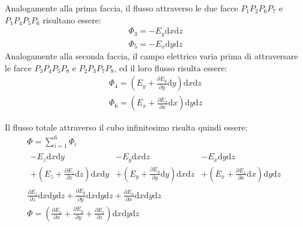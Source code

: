 \documentclass{article}
\newcommand{\df}{\mathrm{d}}
\numberwithin{equation}{subsection}
\begin{document}
Analogamente alla prima faccia, il flusso attraverso le due facce $P_1P_2P_6P_7$ e $P_1P_4P_5P_6$ risultano essere:
\begin{gather*}
    \Phi_3=-E_y\df x\df z\\
    \Phi_5=-E_x\df y\df z
\end{gather*}
Analogamente alla seconda faccia, il campo elettrico varia prima di attraversare le facce $P_3P_4P_5P_8$ e $P_2P_3P_7P_8$, ed il loro flusso risulta essere:
\begin{gather*}
    \Phi_4=\left(E_y+\displaystyle\frac{\partial E_y}{\partial y}\df  y\right)\df x\df z\\
    \Phi_6=\left(E_x+\displaystyle\frac{\partial E_x}{\partial x}\df  x\right)\df y\df z
\end{gather*}

Il flusso totale attraverso il cubo infinitesimo risulta quindi essere:
\begin{gather*}
    \Phi=\displaystyle\sum_{i=1}^6\Phi_i\\
    \begin{matrix}
        -E_z\df x\df y & -E_y\df x\df z & -E_x\df y\df z\\
        +\left(E_z+\displaystyle\frac{\partial E_z}{\partial z}\df z\right)\df x\df y & +\left(E_y+\displaystyle\frac{\partial E_y}{\partial y}\df  y\right)\df x\df z & +\left(E_x+\displaystyle\frac{\partial E_x}{\partial x}\df  x\right)\df y\df z
    \end{matrix}\\
    \displaystyle\frac{\partial E_z}{\partial z}\df x\df y\df z+\frac{\partial E_y}{\partial y}\df x\df y\df z+\frac{\partial E_x}{\partial x}\df x\df y\df z\\
    \Phi=\left(\displaystyle\frac{\partial E_x}{\partial x}+\frac{\partial E_y}{\partial y}+\frac{\partial E_z}{\partial z}\right)\df x\df y\df z
\end{gather*}
\end{document}
